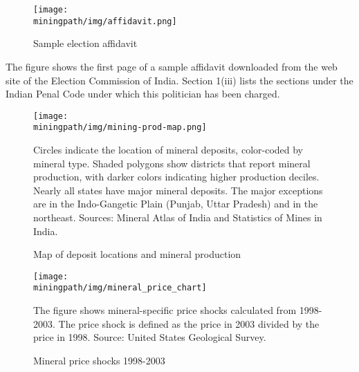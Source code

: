 \begin{figure}[H]\caption{Sample election affidavit}
  \begin{center}
    \texttt{[image: \\miningpath/img/affidavit.png]}
    \label{fig:affidavit}
  \end{center}
\end{figure}  
\begin{adjustwidth}{2cm}{2cm}
  \footnotesize{The figure shows the first page of a sample affidavit downloaded
    from the web site of the Election Commission of India. Section
    1(iii) lists the sections under the Indian Penal Code under which
    this politician has been charged.}
\end{adjustwidth}     


\newpage
\begin{figure}[H]\caption{Map of deposit locations and mineral production}
  \begin{center}
    \texttt{[image: \\miningpath/img/mining-prod-map.png]}
    \label{fig:deposit_map}
  \end{center}
  \begin{adjustwidth}{2cm}{2cm}
    \footnotesize{Circles indicate the location of mineral deposits,
      color-coded by mineral type. Shaded polygons show districts
      that report mineral production, with darker colors indicating
      higher production deciles. Nearly all states have major mineral
      deposits. The major exceptions are in the Indo-Gangetic Plain
      (Punjab, Uttar Pradesh) and in the northeast. Sources: Mineral
      Atlas of India \cite{GeologicalSurveyofIndia2001} and
      Statistics of Mines in India. }
  \end{adjustwidth}
\end{figure}

\newpage
\begin{figure}[H]\caption{Mineral price shocks 1998-2003}
  \begin{center}
    \texttt{[image: \\miningpath/img/mineral\_price\_chart]} 
    \label{fig:bar_pshock_2005}
  \end{center}
  \begin{adjustwidth}{2cm}{2cm}
    \footnotesize{The figure shows mineral-specific price shocks
      calculated from 1998-2003. The price shock is defined as the
      price in 2003 divided by the price in 1998. Source: United
      States Geological Survey.}
  \end{adjustwidth}
\end{figure}

